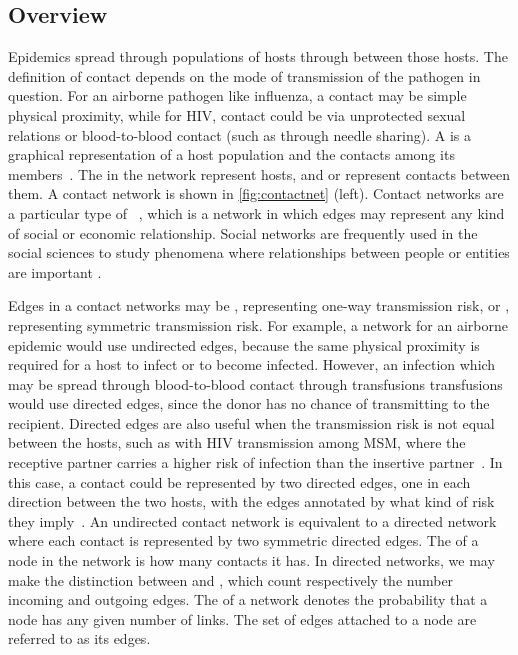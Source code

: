 \subsection{Overview}
\label{subsec:netoverview}

Epidemics spread through populations of hosts through  between
those hosts. The definition of contact depends on the mode of transmission of
the pathogen in question. For an airborne pathogen like influenza, a contact
may be simple physical proximity, while for \gls{HIV}, contact could be via
unprotected sexual relations or blood-to-blood contact (such as through needle
sharing). A  is a graphical representation of a host
population and the contacts among its members~\autocite{klovdahl1985social,
morris1993epidemiology, keeling2005networks}. The  in the network
represent hosts, and  or  represent contacts between
them. A contact network is shown in \cref{fig:contactnet} (left). Contact
networks are a particular type of ~\autocite{moreno1953shall, barnes1954class}, which is a network in
which edges may represent any kind of social or economic relationship. Social
networks are frequently used in the social sciences to study phenomena where
relationships between people or entities are important \autocite[for a review
see][]{wasserman1994social}.

Edges in a contact networks may be , representing one-way
transmission risk, or , representing symmetric transmission
risk. For example, a network for an airborne epidemic would use undirected
edges, because the same physical proximity is required for a host to infect or
to become infected. However, an infection which may be spread through
blood-to-blood contact through transfusions transfusions would use directed
edges, since the donor has no chance of transmitting to the recipient. Directed
edges are also useful when the transmission risk is not equal between the
hosts, such as with \gls{HIV} transmission among \gls{MSM}, where the receptive
partner carries a higher risk of infection than the insertive
partner~\autocite{baggaley2010hiv}. In this case, a contact could be
represented by two directed edges, one in each direction between the two hosts,
with the edges annotated by what kind of risk they
imply~\autocite{wasserman1994social}. An undirected contact network is
equivalent to a directed network where each contact is represented by two
symmetric directed edges. The  of a node in the network is how
many contacts it has. In directed networks, we may make the distinction between
 and , which count respectively the number
incoming and outgoing edges. The  of a network
denotes the probability that a node has any given number of links. The set of
edges attached to a node are referred to as its  edges.

